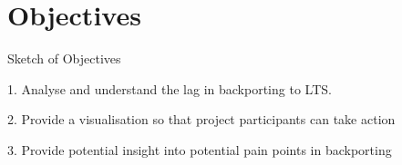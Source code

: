 \section{Objectives}
\label{chp:objectives}

Sketch of Objectives

1. Analyse and understand the lag in backporting to LTS.

2. Provide a visualisation so that project participants can take action

3. Provide potential insight into potential pain points in backporting